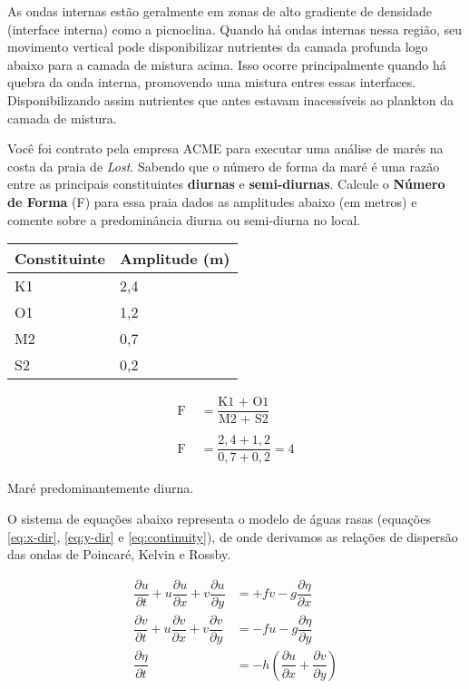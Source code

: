 \documentclass[letterpaper,portuguese,12pt,pdftex]{exam}
\newcommand{\pd}[2]{\dfrac{\partial #1}{\partial #2}}
\begin{document}
\begin{questions}
\begin{solution}
  As ondas internas estão geralmente em zonas de alto gradiente de densidade
  (interface interna) como a picnoclina.  Quando há ondas internas nessa região,
  seu movimento vertical pode disponibilizar nutrientes da camada profunda logo
  abaixo para a camada de mistura acima.  Isso ocorre principalmente quando há
  quebra da onda interna, promovendo uma mistura entres essas interfaces.
  Disponibilizando assim nutrientes que antes estavam inacessíveis ao plankton da camada de mistura.
\end{solution}


\question[2]
Você foi contrato pela empresa ACME\circledR{} para executar uma análise de
marés na costa da praia de {\it Lost}.  Sabendo que o número de forma da maré é uma
razão entre as principais constituintes {\bf diurnas} e {\bf semi-diurnas}.
Calcule o {\bf Número de Forma} (F) para essa praia dados as amplitudes abaixo
(em metros) e comente sobre a predominância diurna ou semi-diurna no local.

\begin{center}
\begin{tabular}{ll}
Constituinte & Amplitude (m)\\
\hline
K1 & 2,4\\
O1 & 1,2\\
M2 & 0,7\\
S2 & 0,2 \\
\hline
\end{tabular}
\end{center}


\begin{solution}
  \begin{align*}
    \text{F} &= \dfrac{\text{K1 + O1}}{\text{M2 + S2}} \\
    \quad \\
    \text{F} &= \dfrac{2,4 + 1,2}{0,7 + 0,2} = 4
  \end{align*}

  Maré predominantemente diurna.
\end{solution}


\question[1]
O sistema de equações abaixo representa o modelo de águas
rasas (equações \ref{eq:x-dir}, \ref{eq:y-dir} e \ref{eq:continuity}), de onde
derivamos as relações de dispersão das ondas de Poincaré, Kelvin e Rossby.

\begin{align}
  \pd{u}{t} + u\pd{u}{x} + v\pd{u}{y} &= +fv -g\pd{\eta}{x} \label{eq:x-dir} \\
  \pd{v}{t} + u\pd{v}{x} + v\pd{v}{y}&= -fu -g\pd{\eta}{y} \label{eq:y-dir} \\
  \pd{\eta}{t} &= -h\left({\pd{u}{x}} + \pd{v}{y}\right) \label{eq:continuity}
\end{align}


\end{questions}
\end{document}
